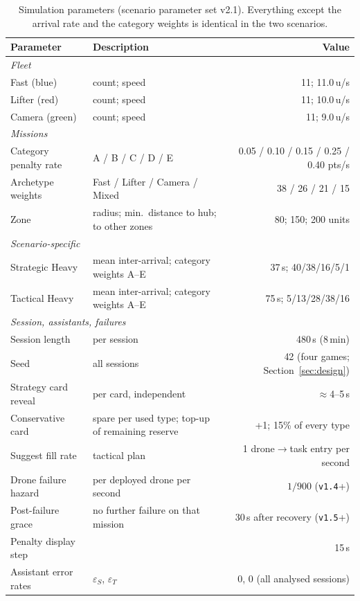 \documentclass[10pt]{article}
\theoremstyle{definition}
\begin{document}
\begin{table}[htbp]
\centering
\caption{Simulation parameters (scenario parameter set v2.1). Everything except the arrival rate and the category
weights is identical in the two scenarios.}
\label{tab:params}
\small
\renewcommand{\arraystretch}{1.2}
\begin{tabular}{llr}
\toprule
\textbf{Parameter} & \textbf{Description} & \textbf{Value} \\
\midrule
\multicolumn{3}{l}{\textit{Fleet}} \\
Fast (blue)    & count; speed & 11; 11.0\,u/s \\
Lifter (red)   & count; speed & 11; 10.0\,u/s \\
Camera (green) & count; speed & 11; 9.0\,u/s \\
\midrule
\multicolumn{3}{l}{\textit{Missions}} \\
Category penalty rate & A / B / C / D / E & 0.05 / 0.10 / 0.15 / 0.25 / 0.40 pts/s \\
Archetype weights & Fast / Lifter / Camera / Mixed & 38 / 26 / 21 / 15 \\
Zone & radius; min.\ distance to hub; to other zones & 80; 150; 200 units \\
\midrule
\multicolumn{3}{l}{\textit{Scenario-specific}} \\
Strategic Heavy & mean inter-arrival; category weights A--E & 37\,s; 40/38/16/5/1 \\
Tactical Heavy  & mean inter-arrival; category weights A--E & 75\,s; 5/13/28/38/16 \\
\midrule
\multicolumn{3}{l}{\textit{Session, assistants, failures}} \\
Session length & per session & 480\,s (8\,min) \\
Seed & all sessions & 42 (four games; Section~\ref{sec:design}) \\
Strategy card reveal & per card, independent & $\approx$4--5\,s \\
Conservative card & spare per used type; top-up of remaining reserve & +1; 15\% of every type \\
Suggest fill rate & tactical plan & 1 drone$\rightarrow$task entry per second \\
Drone failure hazard & per deployed drone per second & $1/900$ (\texttt{v1.4}+) \\
Post-failure grace & no further failure on that mission & 30\,s after recovery (\texttt{v1.5}+) \\
Penalty display step & & 15\,s \\
Assistant error rates & $\varepsilon_S$, $\varepsilon_T$ & 0, 0 (all analysed sessions) \\
\bottomrule
\end{tabular}
\end{table}
\end{document}
